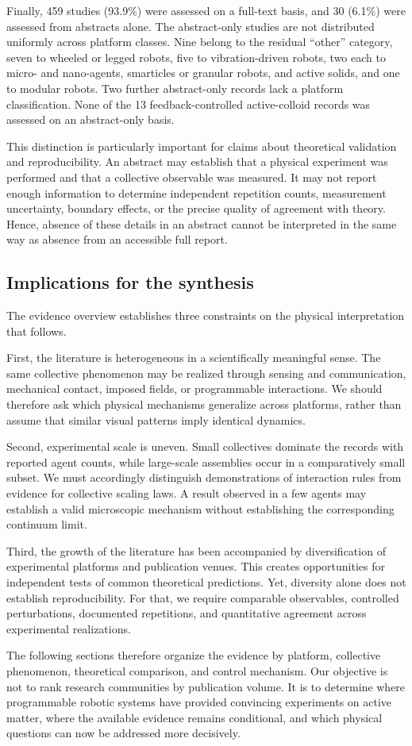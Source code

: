 Finally, 459 studies (93.9\%) were assessed on a full-text basis, and 30 (6.1\%) were assessed from abstracts alone. The abstract-only studies are not distributed uniformly across platform classes. Nine belong to the residual ``other'' category, seven to wheeled or legged robots, five to vibration-driven robots, two each to micro- and nano-agents, smarticles or granular robots, and active solids, and one to modular robots. Two further abstract-only records lack a platform classification. None of the 13 feedback-controlled active-colloid records was assessed on an abstract-only basis.

This distinction is particularly important for claims about theoretical validation and reproducibility. An abstract may establish that a physical experiment was performed and that a collective observable was measured. It may not report enough information to determine independent repetition counts, measurement uncertainty, boundary effects, or the precise quality of agreement with theory. Hence, absence of these details in an abstract cannot be interpreted in the same way as absence from an accessible full report.

\subsection{Implications for the synthesis}
\label{sec:results-implications}

The evidence overview establishes three constraints on the physical interpretation that follows.

First, the literature is heterogeneous in a scientifically meaningful sense. The same collective phenomenon may be realized through sensing and communication, mechanical contact, imposed fields, or programmable interactions. We should therefore ask which physical mechanisms generalize across platforms, rather than assume that similar visual patterns imply identical dynamics.

Second, experimental scale is uneven. Small collectives dominate the records with reported agent counts, while large-scale assemblies occur in a comparatively small subset. We must accordingly distinguish demonstrations of interaction rules from evidence for collective scaling laws. A result observed in a few agents may establish a valid microscopic mechanism without establishing the corresponding continuum limit.

Third, the growth of the literature has been accompanied by diversification of experimental platforms and publication venues. This creates opportunities for independent tests of common theoretical predictions. Yet, diversity alone does not establish reproducibility. For that, we require comparable observables, controlled perturbations, documented repetitions, and quantitative agreement across experimental realizations.

The following sections therefore organize the evidence by platform, collective phenomenon, theoretical comparison, and control mechanism. Our objective is not to rank research communities by publication volume. It is to determine where programmable robotic systems have provided convincing experiments on active matter, where the available evidence remains conditional, and which physical questions can now be addressed more decisively.
